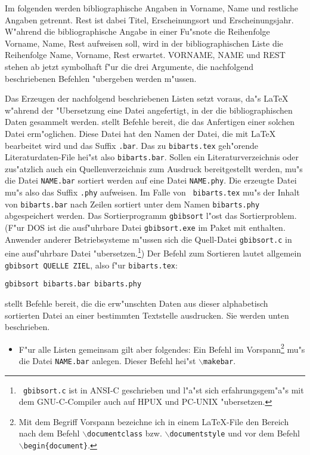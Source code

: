\documentclass[11pt]{article}                    %
\def\Befehl#1{{\tt$\backslash$#1}}
\def\Punkt#1{\begin{itemize}\item{#1}\end{itemize}}
\begin{document}
  Im folgenden werden bibliographische Angaben in Vorname, Name und restliche
  Angaben getrennt. Rest ist dabei Titel, Erscheinungsort und
  Erscheinungsjahr. W"ahrend die bibliographische Angabe in einer Fu"snote
  die Reihenfolge \frq Vorname, Name, Rest\flq{} aufweisen soll, wird in der
  bibliographischen Liste die Reihenfolge \frq Name, Vorname, Rest\flq{}
  erwartet. VORNAME, NAME und REST stehen ab jetzt symbolhaft f"ur die drei
  Argumente, die nachfolgend beschriebenen Befehlen "ubergeben werden
  m"ussen.

  Das Erzeugen der nachfolgend beschriebenen Listen setzt voraus, da"s
  \LaTeX{} w"ahrend der "Ubersetzung eine Datei angefertigt, in der die
  bibliographischen Daten gesammelt werden. \bibarts{} stellt Befehle bereit,
  die das Anfertigen einer solchen Datei erm"oglichen. Diese Datei hat den
  Namen der Datei, die mit \LaTeX{} bearbeitet wird und das Suffix {\tt.bar}.
  Das zu {\tt bibarts.tex} geh"orende Literaturdaten-File hei"st also
  {\tt bibarts.bar}. Sollen ein Literaturverzeichnis oder zus"atzlich auch
  ein Quellenverzeichnis zum Ausdruck bereitgestellt werden, mu"s die Datei
  {\tt NAME.bar} sortiert werden auf eine Datei {\tt NAME.phy}. Die erzeugte
  Datei mu"s also das Suffix {\tt.phy} aufweisen. Im Falle von {\tt
  bibarts.tex} mu"s der Inhalt von {\tt bibarts.bar} nach Zeilen sortiert
  unter dem Namen {\tt bibarts.phy} abgespeichert werden. Das
  Sortierprogramm {\tt gbibsort} l"ost das Sortierproblem. (F"ur DOS ist
  die ausf"uhrbare Datei {\tt gbibsort.exe} im Paket \bibarts{} mit
  enthalten. Anwender anderer Betriebsysteme m"ussen sich die Quell-Datei
  {\tt gbibsort.c} in eine ausf"uhrbare Datei "ubersetzen.\footnote{{\tt
  gbibsort.c} ist in ANSI-C geschrieben und l"a"st sich erfahrungsgem"a"s
  mit dem GNU-C-Compiler auch auf HPUX und PC-UNIX "ubersetzen.}) Der
  Befehl zum Sortieren lautet allgemein {\tt gbibsort QUELLE ZIEL}, also
  f"ur {\tt bibarts.tex}:

  \begin{center}{\tt gbibsort bibarts.bar bibarts.phy}\end{center}

  \bibarts{} stellt Befehle bereit, die die erw"unschten Daten aus dieser
  alphabetisch sortierten Datei an einer bestimmten Textstelle ausdrucken.
  Sie werden unten beschrieben.

  \Punkt{F"ur alle Listen gemeinsam gilt aber folgendes: Ein Befehl im
  Vorspann\footnote{Mit dem Begriff Vorspann bezeichne ich in einem
  \LaTeX-File den Bereich nach dem Befehl \Befehl{documentclass} bzw.
  \Befehl{documentstyle} und vor dem Befehl \Befehl{begin\{document\}}.} mu"s
  die Datei {\tt NAME.bar} anlegen. Dieser Befehl hei"st
  \Befehl{makebar}\addtobib{makebar@\protect\Befehl{makebar}}.}
\end{document}
